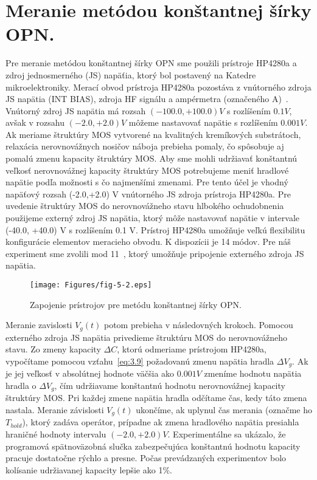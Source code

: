 \section{Meranie metódou konštantnej šírky OPN.}\label{sec:5.3}

Pre meranie metódou konštantnej šírky OPN sme použili prístroje
HP4280a a zdroj jednosmerného (JS) napäťia, ktorý bol postavený na
Katedre mikroelektroniky. Merací obvod prístroja HP4280a pozostáva z
vnútorného zdroja JS napätia (INT BIAS), zdroja HF signálu a
ampérmetra (označeného A)~\cite{5.7}. Vnútorný zdroj JS napätia má
rozsah $(-100.0,+100.0)V$ s rozlíšením $0.1V$, avšak v rozsahu
$(-2.0,+2.0)V$ môžeme nastavovať napätie s rozlíšením $0.001V$. Ak
meriame štruktúry MOS vytvorené na kvalitných kremíkových substrátoch,
relaxácia nerovnovážnych nosičov náboja prebieha pomaly, čo spôsobuje
aj pomalú zmenu kapacity štruktúry MOS\@. Aby sme mohli udržiavať
konštantnú veľkosť nerovnovážnej kapacity štruktúry MOS potrebujeme
meniť hradlové napätie podľa možnosti s čo najmenšími zmenami. Pre
tento účel je vhodný napäťový rozsah (-2.0,+2.0) V vnútorného JS
zdroja prístroja HP4280a. Pre uvedenie štruktúry MOS do nerovnovážneho
stavu hlbokého ochudobnenia použijeme externý zdroj JS napätia, ktorý
môže nastavovať napätie v intervale (-40.0, +40.0) V s rozlíšením 0.1
V. Prístroj HP4280a umožňuje veľkú flexibilitu konfigurácie elementov
meracieho obvodu. K dispozícii je 14 módov. Pre náš experiment sme
zvolili mod 11~\cite{5.2}, ktorý umožňuje pripojenie externého zdroja
JS napätia.

\begin{figure}[h!]\centering
  \texttt{[image: Figures/fig-5-2.eps]}
  \caption[Zapojenie prístrojov pre metódu konštantnej šírky
    OPN]{Zapojenie prístrojov pre metódu konštantnej šírky
    OPN.}\label{fig:5.2}
\end{figure}

Meranie zavislosti $V_{g}(t)$ potom prebieha v následovných
krokoch. Pomocou externého zdroja JS napätia privedieme štruktúru MOS
do nerovnovážneho stavu. Zo zmeny kapacity $\Delta{C}$, ktorú
odmeriame prístrojom HP4280a, vypočítame pomocou vzťahu~\ref{eq:3.9}
požadovanú zmenu napätia hradla $\Delta{V_{g}}$. Ak je jej veľkosť v
absolútnej hodnote väčšia ako $0.001 V$ zmeníme hodnotu napätia hradla
o $\Delta{V_{g}}$, čím udržiavame konštantnú hodnotu nerovnovážnej
kapacity štruktúry MOS\@. Pri každej zmene napätia hradla odčítame
čas, kedy táto zmena nastala. Meranie závislosti $V_{g}(t)$ ukončíme,
ak uplynul čas merania (označme ho $T_{hold}$), ktorý zadáva operátor,
prípadne ak zmena hradlového napätia presiahla hraničné hodnoty
intervalu $(-2.0,+2.0) V$.  Experimentálne sa ukázalo, že programová
spätnoväzobná slučka zabezpečujúca konštantnú hodnotu kapacity pracuje
dostatočne rýchlo a presne. Počas prevádzaných experimentov bolo
kolísanie udržiavanej kapacity lepšie ako 1\%.

